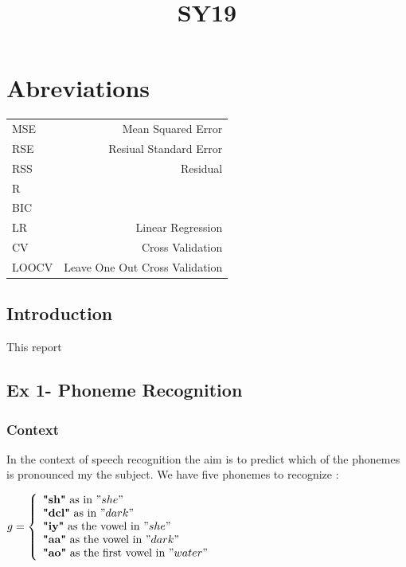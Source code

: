 \documentclass[]{report}
\title{SY19}
\author{}
\begin{document}
	

\maketitle

\part{Abreviations}
\begin{tabular}{l r}
	MSE & Mean Squared Error \\
	RSE & Resiual Standard Error\\ 
	RSS & Residual \\
	R & \\
	BIC &\\
	LR & Linear Regression \\
	CV & Cross Validation \\
	LOOCV & Leave One Out Cross Validation \\
	
\end{tabular}
\begin{abstract}

\end{abstract}

\chapter{Introduction}
This report

\chapter{Ex 1- Phoneme Recognition}
\section{Context}
In the context of speech recognition the aim is to predict which of the phonemes is pronounced my the subject. We have five phonemes to recognize :\\ 
\begin{center}
	$g = \left\{
	\begin{array}{l}
	\textbf{"sh"} \text{ as in } "she" \\
	\textbf{"dcl"} \text{ as in } "dark" \\
	\textbf{"iy"} \text{ as the vowel in } "she" \\ 
	\textbf{"aa"} \text{ as the vowel in }  "dark"\\
	\textbf{"ao"} \text{ as the first vowel in }  "water"
	\end{array}
	\right.$
\end{center}
\end{document}
